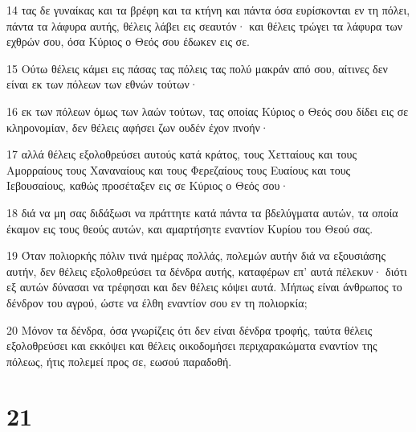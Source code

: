 \par 14 τας δε γυναίκας και τα βρέφη και τα κτήνη και πάντα όσα ευρίσκονται εν τη πόλει, πάντα τα λάφυρα αυτής, θέλεις λάβει εις σεαυτόν· και θέλεις τρώγει τα λάφυρα των εχθρών σου, όσα Κύριος ο Θεός σου έδωκεν εις σε.
\par 15 Ούτω θέλεις κάμει εις πάσας τας πόλεις τας πολύ μακράν από σου, αίτινες δεν είναι εκ των πόλεων των εθνών τούτων·
\par 16 εκ των πόλεων όμως των λαών τούτων, τας οποίας Κύριος ο Θεός σου δίδει εις σε κληρονομίαν, δεν θέλεις αφήσει ζων ουδέν έχον πνοήν·
\par 17 αλλά θέλεις εξολοθρεύσει αυτούς κατά κράτος, τους Χετταίους και τους Αμορραίους τους Χαναναίους και τους Φερεζαίους τους Ευαίους και τους Ιεβουσαίους, καθώς προσέταξεν εις σε Κύριος ο Θεός σου·
\par 18 διά να μη σας διδάξωσι να πράττητε κατά πάντα τα βδελύγματα αυτών, τα οποία έκαμον εις τους θεούς αυτών, και αμαρτήσητε εναντίον Κυρίου του Θεού σας.
\par 19 Όταν πολιορκής πόλιν τινά ημέρας πολλάς, πολεμών αυτήν διά να εξουσιάσης αυτήν, δεν θέλεις εξολοθρεύσει τα δένδρα αυτής, καταφέρων επ' αυτά πέλεκυν· διότι εξ αυτών δύνασαι να τρέφησαι και δεν θέλεις κόψει αυτά. Μήπως είναι άνθρωπος το δένδρον του αγρού, ώστε να έλθη εναντίον σου εν τη πολιορκία;
\par 20 Μόνον τα δένδρα, όσα γνωρίζεις ότι δεν είναι δένδρα τροφής, ταύτα θέλεις εξολοθρεύσει και εκκόψει και θέλεις οικοδομήσει περιχαρακώματα εναντίον της πόλεως, ήτις πολεμεί προς σε, εωσού παραδοθή.

\chapter{21}

